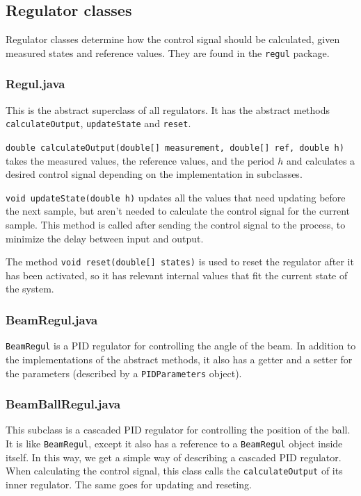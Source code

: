 



\subsection{Regulator classes}
Regulator classes determine how the control signal should be calculated, given measured states and reference values. 
They are found in the \texttt{regul} package.

\subsubsection{Regul.java}
This is the abstract superclass of all regulators. 
It has the abstract methods \texttt{calculateOutput}, \texttt{updateState} and \texttt{reset}.

\texttt{double calculateOutput(double[] measurement, double[] ref, double h)} takes the measured values, the reference values, and the period $h$ and calculates a desired control signal depending on the implementation in subclasses.

\texttt{void updateState(double h)} updates all the values that need updating before the next sample, but aren't needed to calculate the control signal for the current sample. 
This method is called after sending the control signal to the process, to minimize the delay between input and output.

The method \texttt{void reset(double[] states)} is used to reset the regulator after it has been activated, so it has relevant internal values that fit the current state of the system.

\subsubsection{BeamRegul.java}
\texttt{BeamRegul} is a PID regulator for controlling the angle of the beam. 
In addition to the implementations of the abstract methods, it also has a getter and a setter for the parameters (described by a \texttt{PIDParameters} object).

\subsubsection{BeamBallRegul.java}
This subclass is a cascaded PID regulator for controlling the position of the ball. 
It is like \texttt{BeamRegul}, except it also has a reference to a \texttt{BeamRegul} object inside itself. 
In this way, we get a simple way of describing a cascaded PID regulator. 
When calculating the control signal, this class calls the \texttt{calculateOutput} of its inner regulator. 
The same goes for updating and reseting.

